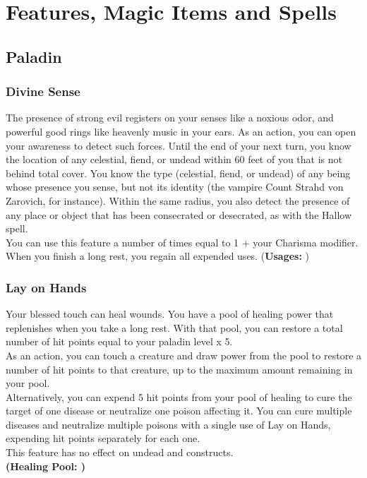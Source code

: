 \documentclass[letterpaper,openany,oneside,twocolumn]{book}
\begin{document}
\onecolumn


\rendercharactersheet

\renderbackgroundsheet

\renderspellsheet


\restoregeometry
\twocolumn

\chapter*{Features, Magic Items and Spells}

\section*{Paladin}
\subsection*{Divine Sense}
The presence of strong evil registers on your senses like a noxious odor, and powerful good rings like heavenly music in your ears. As an action, you can open your awareness to detect such forces. Until the end of your next turn, you know the location of any celestial, fiend, or undead within 60 feet of you that is not behind total cover. You know the type (celestial, fiend, or undead) of any being whose presence you sense, but not its identity (the vampire Count Strahd von Zarovich, for instance). Within the same radius, you also detect the presence of any place or object that has been consecrated or desecrated, as with the Hallow spell.\\
You can use this feature a number of times equal to 1 + your Charisma modifier. When you finish a long rest, you regain all expended uses. (\textbf{Usages: })
\subsection*{Lay on Hands}
Your blessed touch can heal wounds. You have a pool of healing power that replenishes when you take a long rest. With that pool, you can restore a total number of hit points equal to your paladin level x 5.\\
As an action, you can touch a creature and draw power from the pool to restore a number of hit points to that creature, up to the maximum amount remaining in your pool.\\
Alternatively, you can expend 5 hit points from your pool of healing to cure the target of one disease or neutralize one poison affecting it. You can cure multiple diseases and neutralize multiple poisons with a single use of Lay on Hands, expending hit points separately for each one.\\
This feature has no effect on undead and constructs. \\
\textbf{(Healing Pool: )}
\end{document}
